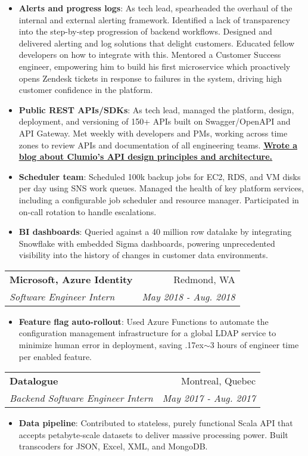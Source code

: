 \documentclass[letterpaper,11pt]{article}
\makeatletter
\newcommand{\resumeItem}[2]{
  \item\small{
    \textbf{#1}{: #2 \vspace{-2pt}}
  }
}
\newcommand{\resumeSubheading}[4]{
  \vspace{-1pt}
    \begin{tabular*}{0.97\textwidth}{l@{\extracolsep{\fill}}r}
      \textbf{#1} & #2 \\
      \textit{\small#3} & \textit{\small #4} \\
    \end{tabular*}\vspace{-5pt}
}
\newcommand{\resumeItemListStart}{\begin{itemize}}
\newcommand{\resumeItemListEnd}{\end{itemize}\vspace{-5pt}}
\makeatother
\begin{document}
      \resumeItemListStart
        \resumeItem{Alerts and progress logs}
          {As tech lead, spearheaded the overhaul of the internal and external alerting framework. Identified a lack of transparency into the step-by-step progression of backend workflows. Designed and delivered alerting and log solutions that delight customers. Educated fellow developers on how to integrate with this. Mentored a Customer Success engineer, empowering him to build his first microservice which proactively opens Zendesk tickets in response to failures in the system, driving high customer confidence in the platform.}
        \resumeItem{Public REST APIs/SDKs}
          {As tech lead, managed the platform, design, deployment, and versioning of 150+ APIs built on Swagger/OpenAPI and API Gateway. Met weekly with developers and PMs, working across time zones to review APIs and documentation of all engineering teams. \newline \href{https://clumio.com/an-outstanding-user-experience-for-api-developers-think-ux-for-rest-apis/}{\underline{\textbf{Wrote a blog about Clumio's API design principles and architecture.}}}}
      \resumeItem{Scheduler team}
          {Scheduled 100k backup jobs for EC2, RDS, and VM disks per day using SNS work queues. Managed the health of key platform services, including a configurable job scheduler and resource manager. Participated in on-call rotation to handle escalations.}
      \resumeItem{BI dashboards}
          {Queried against a 40 million row datalake by integrating Snowflake with embedded Sigma dashboards, powering unprecedented visibility into the history of changes in customer data environments.}
      \resumeItemListEnd
    \vspace{5mm}
    \resumeSubheading
      {Microsoft, Azure Identity}{Redmond, WA}
      {Software Engineer Intern}{May 2018 - Aug. 2018}
      \resumeItemListStart
        \resumeItem{Feature flag auto-rollout}
          {Used Azure Functions to automate the configuration management infrastructure for a global LDAP service to minimize human error in deployment, saving {\raise.17ex\hbox{$\scriptstyle\sim$}}3 hours of engineer time per enabled feature.}
      \resumeItemListEnd
    \vspace{5mm}
    \resumeSubheading
      {Datalogue}{Montreal, Quebec}
      {Backend Software Engineer Intern}{May 2017 - Aug. 2017}
      \resumeItemListStart
        \resumeItem{Data pipeline}
      {Contributed to stateless, purely functional Scala API that accepts petabyte-scale datasets to deliver massive processing power. Built transcoders for JSON, Excel, XML, and MongoDB.}
      \resumeItemListEnd
\end{document}
